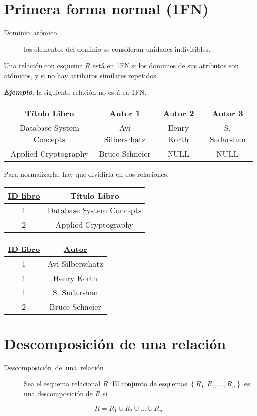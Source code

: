 \documentclass[a4paper, twoside]{article}
\begin{document}
\section{Primera forma normal (1FN)}
\begin{description}
\item [{Dominio~atómico}] los elementos del dominio se consideran unidades
indivisibles.
\end{description}
Una relación con esquema $R$ está en 1FN si los dominios de sus atributos
son atómicos, y si no hay atributos similares repetidos.

\textbf{\emph{Ejemplo}}: la siguiente relación no está en 1FN.

\begin{tabular}{|c|c|c|c|}
\hline 
\uline{Título Libro} & Autor 1 & Autor 2 & Autor 3\\
\hline 
\hline 
Database System Concepts & Avi Silberschatz & Henry Korth & S. Sudarshan\\
\hline 
Applied Cryptography & Bruce Schneier & NULL & NULL\\
\hline 
\end{tabular}

Para normalizarla, hay que dividirla en dos relaciones.

\begin{tabular}{|c|c|}
\hline 
\uline{ID libro} & Título Libro\\
\hline 
\hline 
1 & Database System Concepts\\
\hline 
2 & Applied Cryptography\\
\hline 
\end{tabular}

\begin{tabular}{|c|c|}
\hline 
\uline{ID libro} & \uline{Autor}\\
\hline 
\hline 
1 & Avi Silberschatz\\
\hline 
1 & Henry Korth\\
\hline 
1 & S. Sudarshan\\
\hline 
2 & Bruce Schneier\\
\hline 
\end{tabular}


\section{Descomposición de una relación}
\begin{description}
\item [{Descomposición~de~una~relación}] Sea el esquema relacional $R$.
El conjunto de esquemas $\left\{ R_{1},R_{2},\dots,R_{n}\right\} $
es una descomposición de $R$ si
\end{description}
\[
R=R_{1}\cup R_{2}\cup\dots\cup R_{n}
\]
\end{document}
